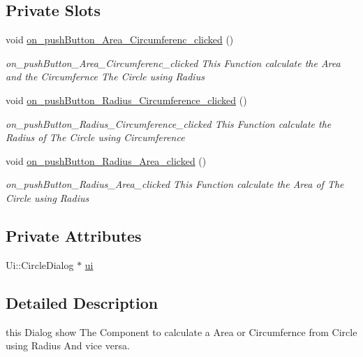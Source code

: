 \subsection*{Private Slots}
\begin{DoxyCompactItemize}
\item 
void \mbox{\hyperlink{class_circle_dialog_a30ff932eb29dc95c4467ba421b5851a8}{on\+\_\+push\+Button\+\_\+\+Area\+\_\+\+Circumferenc\+\_\+clicked}} ()
\begin{DoxyCompactList}\small\item\em on\+\_\+push\+Button\+\_\+\+Area\+\_\+\+Circumferenc\+\_\+clicked This Function calculate the Area and the Circumfernce The Circle using Radius \end{DoxyCompactList}\item 
void \mbox{\hyperlink{class_circle_dialog_ab63c3e021ff34ce5b48c98ec57f40a8e}{on\+\_\+push\+Button\+\_\+\+Radius\+\_\+\+Circumference\+\_\+clicked}} ()
\begin{DoxyCompactList}\small\item\em on\+\_\+push\+Button\+\_\+\+Radius\+\_\+\+Circumference\+\_\+clicked This Function calculate the Radius of The Circle using Circumference \end{DoxyCompactList}\item 
void \mbox{\hyperlink{class_circle_dialog_ad4190e5db5c4d25be7643053b82e0f76}{on\+\_\+push\+Button\+\_\+\+Radius\+\_\+\+Area\+\_\+clicked}} ()
\begin{DoxyCompactList}\small\item\em on\+\_\+push\+Button\+\_\+\+Radius\+\_\+\+Area\+\_\+clicked This Function calculate the Area of The Circle using Radius \end{DoxyCompactList}\end{DoxyCompactItemize}
\subsection*{Private Attributes}
\begin{DoxyCompactItemize}
\item 
Ui\+::\+Circle\+Dialog $\ast$ \mbox{\hyperlink{class_circle_dialog_a44a0e6657fdc9ee80e99a6179e82564a}{ui}}
\end{DoxyCompactItemize}


\subsection{Detailed Description}
this Dialog show The Component to calculate a Area or Circumfernce from Circle using Radius And vice versa. 

